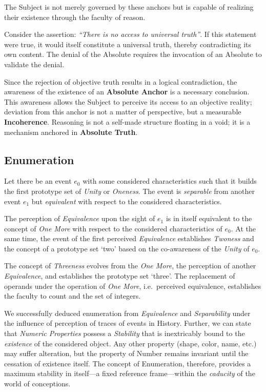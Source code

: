 \documentclass[11pt, a4paper]{article}
\theoremstyle{formalism}
\begin{document}
{The Subject is not merely governed by these anchors but is capable of realizing
their existence through the faculty of reason. 

Consider the assertion: \textit{``There is no access to universal truth''}. If
this statement were true, it would itself constitute a universal truth, thereby
contradicting its own content. The denial of the Absolute requires the
invocation of an Absolute to validate the denial.

Since the rejection of objective truth results in a logical contradiction, the
awareness of the existence of an \textbf{Absolute Anchor} is a necessary
conclusion. This awareness allows the Subject to perceive its access to an
objective reality; deviation from this anchor is not a matter of perspective,
but a measurable \textbf{Incoherence}. Reasoning is not a self-made structure
floating in a void; it is a mechanism anchored in \textbf{Absolute Truth}.

\subsection{Enumeration}

Let there be an event $e_0$ with some considered characteristics such that it
builds the first prototype set of \textit{Unity} or \textit{Oneness}. The event
is \textit{separable} from another event $e_1$ but \textit{equivalent} with
respect to the considered characteristics.

The perception of \textit{Equivalence} upon the sight of $e_1$ is in itself
equivalent to the concept of \textit{One More} with respect to the considered
characteristics of $e_0$. At the same time, the event of the first perceived
\textit{Equivalence} establishes \textit{Twoness} and the concept of a
prototype set `two' based on the co-awareness of the \textit{Unity} of $e_0$. 

The concept of \textit{Threeness} evolves from the \textit{One More}, the
perception of another \textit{Equivalence}, and establishes the prototype set
`three'. The replacement of operands under the operation of \textit{One More},
i.e.\ perceived equivalence, establishes the faculty to count and the set of
integers.

We successfully deduced enumeration from \textit{Equivalence} and
\textit{Separability} under the influence of perception of traces of events in
History. Further, we can state that \textit{Numeric Properties} possess a
\textit{Stability} that is inextricably bound to the \textit{existence} of the
considered object. Any other property (shape, color, name, etc.) may suffer
alteration, but the property of Number remains invariant until the cessation of
existence itself. The concept of Enumeration, therefore, provides a maximum
stability in itself—a fixed reference frame—within the \textit{caducity} of the
world of conceptions.

}
\end{document}
